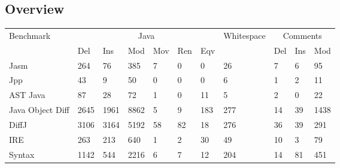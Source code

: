 \subsection{Overview}
\begin{table}
    \begin{tabular}{l|llllll|l|lll}
    Benchmark        & \multicolumn{6}{|c|}{Java}           & Whitespace & \multicolumn{3}{|c}{Comments} \\ \cline{2-7} \cline{9-11}
    ~                & Del  & Ins  & Mod  & Mov & Ren & Eqv & ~          & Del      & Ins & Mod  \\ \hline
    Jasm             & 264  & 76   & 385  & 7   & 0   & 0   & 26         & 7        & 6   & 95   \\
    Jpp              & 43   & 9    & 50   & 0   & 0   & 0   & 6          & 1        & 2   & 11   \\
    AST Java         & 87   & 28   & 72   & 1   & 0   & 11  & 5          & 2        & 0   & 22   \\
    Java Object Diff & 2645 & 1961 & 8862 & 5   & 9   & 183 & 277        & 14       & 39  & 1438 \\
    DiffJ            & 3106 & 3164 & 5192 & 58  & 82  & 18  & 276        & 36       & 39  & 291  \\
    IRE              & 263  & 213  & 640  & 1   & 2   & 30  & 49         & 10       & 3   & 79   \\
    Syntax           & 1142 & 544  & 2216 & 6   & 7   & 12  & 204        & 14       & 81  & 451  \\
    \end{tabular}
\end{table}






